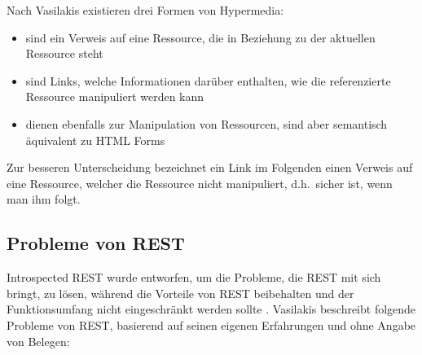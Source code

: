 \para{}Nach Vasilakis existieren drei Formen von Hypermedia:

\begin{itemize}[noitemsep,topsep=0pt]
    \item {} sind ein Verweis auf eine Ressource, die in Beziehung zu der aktuellen Ressource steht
    \item {} sind Links, welche Informationen darüber enthalten, wie die referenzierte Ressource manipuliert werden kann
    \item {} dienen ebenfalls zur Manipulation von Ressourcen, sind aber semantisch äquivalent zu HTML Forms \autocite[Abs.~9.1.2]{Vasilakis2017}
\end{itemize}
Zur besseren Unterscheidung bezeichnet ein Link im Folgenden einen Verweis auf eine Ressource, welcher die Ressource nicht manipuliert, d.h.\ sicher ist, wenn man ihm folgt.

\subsection{Probleme von REST}\label{subsec:intrest|theory|rest-problems}
Introspected REST wurde entworfen, um die Probleme, die REST mit sich bringt, zu lösen, während die Vorteile von REST beibehalten und der Funktionsumfang nicht eingeschränkt werden sollte \autocite[Kap.~0, 2]{Vasilakis2017}. Vasilakis beschreibt folgende Probleme von REST, basierend auf seinen eigenen Erfahrungen und ohne Angabe von Belegen:

